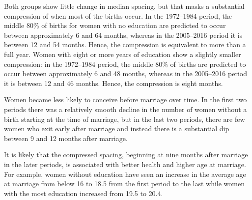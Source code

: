 \documentclass[12pt,letterpaper]{article}
\begin{document}
Both groups show little change in median spacing, but that masks a substantial
compression of when most of the births occur.
In the 1972--1984 period, the middle 80\% of births for women with no education 
are predicted to occur between approximately 6 and 64 months, whereas in the 
2005--2016 period it is between 12 and 54 months.
Hence, the compression is equivalent to more than a full year.
Women with eight or more years of education show a slightly smaller compression:
in the 1972--1984 period, the middle 80\% of births are predicted to occur between
approximately 6 and 48 months, whereas in the 2005--2016 period it is between
12 and 46 months.
Hence, the compression is eight months.

Women became less likely to conceive before marriage over time.
In the first two periods there was a relatively smooth decline in the number of
women without a birth starting at the time of marriage, but in the last two
periods, there are few women who exit early after marriage and
instead there is a substantial dip between 9 and 12 months after
marriage.

It is likely that the compressed spacing, beginning at nine months
after marriage in the later periods, is associated with better health
and higher age at marriage.
For example, women without education have seen an increase in the average 
age at marriage from below 16 to 18.5 from the first period to the last 
while women with the most education increased from 19.5 to 20.4.
\end{document}
